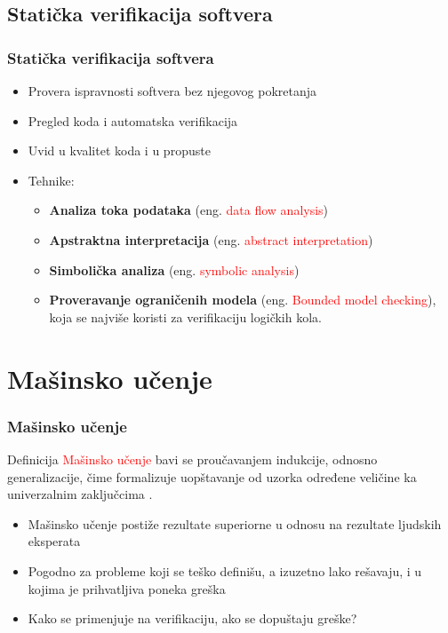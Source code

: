 \documentclass[11pt]{beamer}
\theoremstyle{definition}
\begin{document}
\subsection{Statička verifikacija softvera}
\label{subsec:staticka}

\begin{frame}
\frametitle{Statička verifikacija softvera}
\begin{itemize}
\item Provera ispravnosti softvera bez njegovog pokretanja
\item Pregled koda i automatska verifikacija
\item Uvid u kvalitet koda i u propuste
\item Tehnike:
	\begin{itemize}
		\item \textbf{Analiza toka podataka} (eng. \textcolor{red}{data flow analysis})
		\item \textbf{Apstraktna interpretacija} (eng. \textcolor{red}{abstract interpretation})
		\item \textbf{Simbolička analiza} (eng. \textcolor{red}{symbolic analysis})
		\item \textbf{Proveravanje ograničenih modela} (eng. \textcolor{red}{Bounded model checking}), koja se najviše koristi za verifikaciju logičkih kola.
	\end{itemize}
\end{itemize}
\end{frame}

\section{Mašinsko učenje}

\begin{frame}
\frametitle{Mašinsko učenje}

\begin{block}{Definicija}
\textcolor{red}{Mašinsko učenje} bavi se proučavanjem indukcije, odnosno generalizacije, čime formalizuje uopštavanje od uzorka određene veličine ka univerzalnim zaključcima \cite{bishopML}.
\end{block}

\begin{itemize}
\item Mašinsko učenje postiže rezultate superiorne u odnosu na rezultate ljudskih eksperata
\item Pogodno za probleme koji se teško definišu, a izuzetno lako rešavaju, i u kojima je prihvatljiva poneka greška
\item Kako se primenjuje na verifikaciju, ako se dopuštaju greške?
\end{itemize}

\end{frame}
\end{document}
